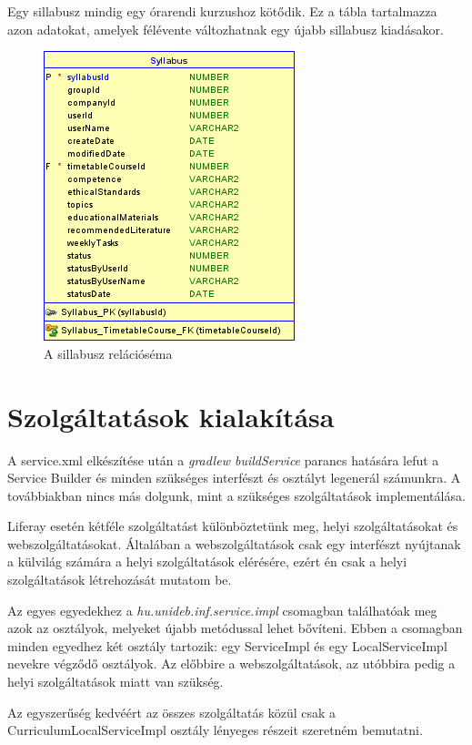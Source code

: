 \documentclass[hidelinks, 12pt, a4paper]{report}
\begin{document}
Egy sillabusz mindig egy órarendi kurzushoz kötődik. Ez a tábla tartalmazza azon adatokat, amelyek félévente változhatnak egy újabb sillabusz kiadásakor.

\begin{figure}[H]
    \centering
	\includegraphics{syllabus.png}
	\caption{A sillabusz relációséma}
\end{figure}

\section{Szolgáltatások kialakítása}

A service.xml elkészítése után a \emph{gradlew buildService} parancs hatására lefut a Service Builder és minden szükséges interfészt és osztályt legenerál számunkra. A továbbiakban nincs más dolgunk, mint a szükséges szolgáltatások implementálása.

Liferay esetén kétféle szolgáltatást különböztetünk meg, helyi szolgáltatásokat és webszolgáltatásokat. Általában a webszolgáltatások csak egy interfészt nyújtanak a külvilág számára a helyi szolgáltatások elérésére, ezért én csak a helyi szolgáltatások létrehozását mutatom be.

Az egyes egyedekhez a \emph{hu.unideb.inf.service.impl} csomagban találhatóak meg azok az osztályok, melyeket újabb metódussal lehet bővíteni. Ebben a csomagban minden egyedhez két osztály tartozik: egy ServiceImpl és egy LocalServiceImpl nevekre végződő osztályok. Az előbbire a webszolgáltatások, az utóbbira pedig a helyi szolgáltatások miatt van szükség.

Az egyszerűség kedvéért az összes szolgáltatás közül csak a CurriculumLocalServiceImpl osztály lényeges részeit szeretném bemutatni.
\end{document}
